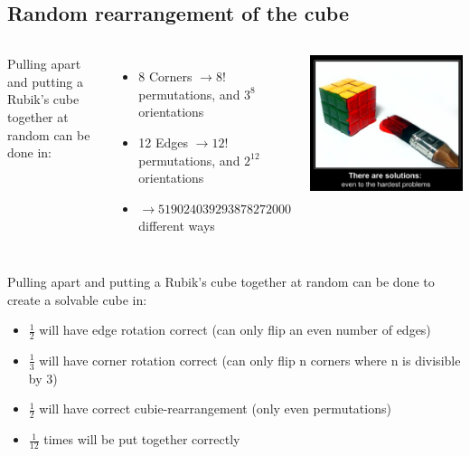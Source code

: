 \documentclass[xcolor=pdftex,dvipsnames,table]{beamer}
\begin{document}
\subsection{Random rearrangement of the cube}
\begin{frame}
  \begin{columns}[cc]
   \column{2.5in}
  Pulling apart and putting a Rubik's cube together at random can be done in:
  \begin{itemize}
    \item 8 Corners $\rightarrow 8!$ permutations, and $3^8$ orientations
    \item 12 Edges $\rightarrow 12!$ permutations, and $2^{12}$ orientations
    \item $\rightarrow 519024039293878272000$ different ways
    \end{itemize}
  \column{1.5in}
  \includegraphics[scale=0.15]{solutionrubik.jpg}
  \end{columns}
\end{frame}

\begin{frame}
  Pulling apart and putting a Rubik's cube together at random can be done to create a solvable cube in:
  \begin{itemize}
    \item $\frac{1}{2}$ will have edge rotation correct (can only flip an even number of edges)
    \item $\frac{1}{3}$ will have corner rotation correct (can only flip n corners where n is divisible by 3)
    \item $\frac{1}{2}$ will have correct cubie-rearrangement (only even permutations)
    \item $\frac{1}{12}$ times will be put together correctly
    \end{itemize}
\end{frame}
\end{document}
